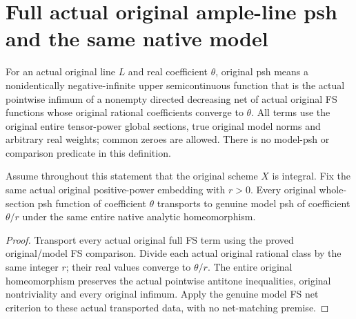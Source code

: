 \section{Full actual original ample-line psh and the same native model}
\label{sec:native-ample-model-psh-comparison}

\begin{definition}
\label{def:native-line-whole-section-psh}
\leanok
{}
For an actual original line $L$ and real coefficient $\theta$, original psh
means a nonidentically negative-infinite upper semicontinuous function that is
the actual pointwise infimum of a nonempty directed decreasing net of actual
original FS functions whose original rational coefficients converge to
$\theta$. All terms use the original entire tensor-power global sections,
true original model norms and arbitrary real weights; common zeroes are
allowed. There is no model-psh or comparison predicate in this definition.
\end{definition}

\begin{theorem}
\label{thm:native-ample-model-full-psh-transport}
\leanok
{}
Assume throughout this statement that the original scheme $X$ is integral.
Fix the same actual original positive-power embedding with $r>0$. Every
original whole-section psh function of coefficient $\theta$ transports to
genuine model psh of coefficient $\theta/r$ under the same entire native
analytic homeomorphism.
\end{theorem}
\begin{proof}
Transport every actual original full FS term using the proved original/model
FS comparison. Divide each actual original rational class by the same integer
$r$; their real values converge to $\theta/r$. The entire original
homeomorphism preserves the actual pointwise antitone inequalities, original
nontriviality and every original infimum. Apply the genuine model FS net
criterion to these actual transported data, with no net-matching premise.
\end{proof}

